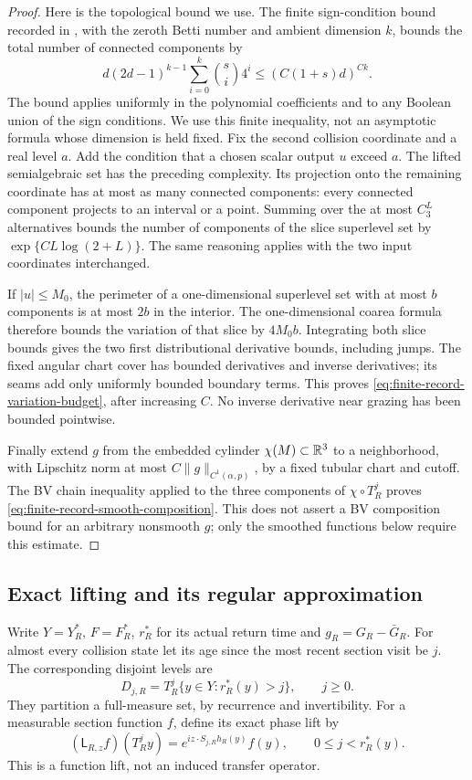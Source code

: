 \begin{proof}
Here is the topological bound we use. The finite sign-condition bound
recorded in \cite[Section 3.2, equation (3.3)]{BPR}, with the zeroth
Betti number and ambient dimension $k$, bounds the total number of
connected components by
\[
 d(2d-1)^{k-1}\sum_{i=0}^{k}\binom{s}{i}4^i
                       \le (C(1+s)d)^{Ck}.
\]
The bound applies uniformly in the polynomial coefficients and to any
Boolean union of the sign conditions. We use this finite inequality,
not an asymptotic formula whose dimension is held fixed.
Fix the second collision coordinate and a real level $a$. Add the
condition that a chosen scalar output $u$ exceed $a$. The lifted
semialgebraic set has the preceding complexity. Its projection onto
the remaining coordinate has at most as many connected components:
every connected component projects to an interval or a point. Summing
over the at most $C_3^L$ alternatives bounds the number of components
of the slice superlevel set by $\exp\{C L\log(2+L)\}$.
The same reasoning applies with the two input coordinates interchanged.

If $|u|\le M_0$, the perimeter of a one-dimensional superlevel set
with at most $b$ components is at most $2b$ in the interior. The
one-dimensional coarea formula therefore bounds the variation of
that slice by $4M_0b$. Integrating both slice bounds gives the two
first distributional derivative bounds, including jumps. The fixed
angular chart cover has bounded derivatives and inverse derivatives;
its seams add only uniformly bounded boundary terms. This proves
\eqref{eq:finite-record-variation-budget}, after increasing $C$.
No inverse derivative near grazing has been bounded pointwise.

Finally extend $g$ from the embedded cylinder
$\chi(M)\subset\mathbb R^3$ to a neighborhood, with Lipschitz norm at most
$C\|g\|_{C^1(\alpha,p)}$, by a fixed tubular chart and cutoff. The
BV chain inequality applied to the three components of
$\chi\circ T_R^j$ proves \eqref{eq:finite-record-smooth-composition}.
This does not assert a BV composition bound for an arbitrary nonsmooth
$g$; only the smoothed functions below require this estimate.
\end{proof}

\subsection{Exact lifting and its regular approximation}
Write $Y=Y_R^*$, $F=F_R^*$, $r_R^*$ for its actual return time and
$g_R=G_R-\bar G_R$. For almost every collision state let its age since
the most recent section visit be $j$. The corresponding disjoint levels
are
\begin{equation}\label{eq:actual-age-levels}
 D_{j,R}=T_R^j\{y\in Y:r_R^*(y)>j\},\qquad j\ge0.
\end{equation}
They partition a full-measure set, by recurrence and invertibility.
For a measurable section function $f$, define its exact phase lift by
\begin{equation}\label{eq:exact-phase-tower-lift}
 (\mathsf L_{R,z}f)(T_R^jy)
       =e^{iz\cdot S_{j,R}h_R(y)}f(y),\qquad 0\le j<r_R^*(y).
\end{equation}
This is a function lift, not an induced transfer operator.

